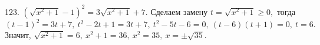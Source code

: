 123. $(\sqrt{x^2+1}-1)^2=3\sqrt{x^2+1}+7.$ Сделаем замену $t=\sqrt{x^2+1}\geqslant0,$ тогда
$(t-1)^2=3t+7,\ t^2-2t+1=3t+7,\ t^2-5t-6=0,\ (t-6)(t+1)=0,\ t=6.$ Значит, $\sqrt{x^2+1}=6,\ x^2+1=36,\ x^2=35,\ x=\pm\sqrt{35}.$\\
